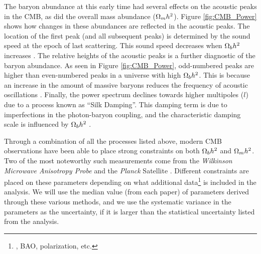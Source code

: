 The baryon abundance at this early time had several effects on the
acoustic peaks in the CMB, as did the overall mass abundance ($\Omega_m
h^2$). Figure \ref{fig:CMB_Power} shows how changes in these
abundances are reflected in the acoustic peaks. The location of the
first peak (and all subsequent peaks) is determined by the sound speed
at the epoch of last scattering. This sound speed decreases when
$\Omega_b h^2$ increases \citep[][ch.~9.8]{Mukhanov2005}. The relative
heights of the acoustic peaks is a further diagnostic of the baryon
abundance. As seen in Figure \ref{fig:CMB_Power}, odd-numbered peaks
are higher than even-numbered peaks in a universe with high $\Omega_b
h^2$. This is because an increase in the amount of massive baryons
reduces the frequency of acoustic oscillations
\citep[][ch.~8.7.3]{Dodelson2003}. Finally, the power spectrum
declines towards higher multipoles ($l$) due to a process known as
``Silk Damping''. This damping term is due to imperfections in the
photon-baryon coupling, and the characteristic damping scale is
influenced by $\Omega_b h^2$ \citep[][ch.~4.7]{Durrer2008}.

Through a combination of all the processes listed above, modern CMB
observations have been able to place strong constraints on both
$\Omega_b h^2$ and $\Omega_m h^2$. Two of the most noteworthy such
measurements come from the \textit{Wilkinson Microwave Anisotropy
  Probe} \citep[\WMAP{},][]{Bennett2003} and the \textit{Planck} Satellite
\citep{PlanckResultsI}. Different constraints are placed on these
parameters depending on what additional data\footnote{\Ho, BAO,
  polarization, etc.} is included in the analysis. We will use the
median value (from each paper) of parameters derived through these
various methods, and we use the systematic variance in the parameters as
the uncertainty, if it is larger than the statistical uncertainty
listed from the analysis.

